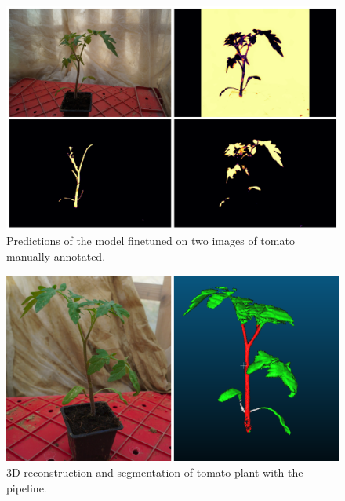 \begin{figure}[h!]
    \centering \includegraphics[width = \linewidth]{figures/finetune.png}
    \caption{Predictions of the model finetuned on two images of tomato manually annotated.} \label{fig:finetune2D}
\end{figure}


\begin{figure}[h!]
    \centering \includegraphics[width = \linewidth]{figures/tomato.png}
    \caption{3D reconstruction and segmentation of tomato plant with the pipeline.} \label{fig:finetune2D}
\end{figure}


